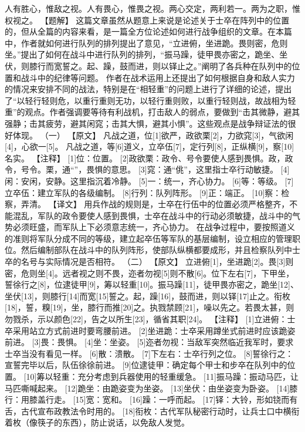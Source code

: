 \documentclass[a4paper,12pt,UTF8,twoside]{ctexbook}
\begin{document}
人有胜心，惟敌之视。人有畏心，惟畏之视。两心交定，两利若一。两为之职，惟权视之。
【题解】
这篇文章虽然从题意上来说是论述关于士卒在阵列中的位置的，但从全篇的内容来看，是一篇全方位论述如何进行战争组织的文章。在本篇中，作者就如何进行队列的排列提出了意见，“立进俯，坐进跪。畏则密，危则坐。”提出了如何在战斗中进行队列的排列，“振马躁，徒甲畏亦密之，跪坐、坐伏，则膝行而宽誓之。起、躁，鼓而进，则以铎止之。”阐明了各兵种在队列中的位置和战斗中的纪律等问题。
作者在战术运用上还提出了如何根据自身和敌人实力的情况来安排不同的战法，特别是在“相轻重”的问题上进行了详细的论述，提出了“以轻行轻则危，以重行重则无功，以轻行重则败，以重行轻则战，故战相为轻重”的观点。作者强调要等待有利战机，打击敌人的弱点，要做到“击其微静，避其强静；击其疲劳，避其闲窕；击其大惧，避其小惧”。这些观点是战争辩证法的很好体现。
（一）
【原文】
凡战之道，位[1]欲严，政欲栗[2]，力欲窕[3]，气欲闲[4]，心欲一[5]。
凡战之道，等[6]道义，立卒伍[7]，定行列[8]，正纵横[9]，察[10]名实。
【注释】
[1]位：位置。
[2]政欲栗：政令、号令要使人感到畏惧。政，政令，号令。栗，通“”，畏惧的意思。
[3]窕：通“佻”，这里指士卒行动敏捷。
[4]闲：安闲，安静。这里指沉着冷静。
[5]一：统一，齐心协力。
[6]等：等级。
[7]立卒伍：建立军队的各级编制。
[8]行列：队列阵形。
[9]正：端正。
[10]察：检察，弄清。
【译文】
用兵作战的规则是，士卒在行伍中的位置必须严格整齐，不能混乱，军队的政令要使人感到畏惧，士卒在战斗中的行动必须敏捷，战斗中的气势必须旺盛，而军队上下必须意志统一，齐心协力。
在战争过程中，要按照道义的准则将军队分成不同的等级，建立起卒伍等军队的基层编制，设立相应的管理职位。然后编制部队在战斗中的队列阵形，使部队纵横都要成形，并且检察队列中士卒的名号与实际情况是否相符。
（二）
【原文】
立进俯[1]，坐进跪[2]。畏[3]则密，危则坐[4]。远者视之则不畏，迩者勿视[5]则不散[6]。位下左右[7]，下甲坐，誓徐行之[8]，位逮徒甲[9]，筹以轻重[10]。振马躁[11]，徒甲畏亦密之，跪坐[12]、坐伏[13]，则膝行[14]而宽[15]誓之。起，躁[16]，鼓而进，则以铎[17]止之。衔枚[18]，誓，糗[19]，坐，膝行而推[20]之。执戮禁顾[21]，噪以先之。若畏太甚，则勿戮杀，示以颜色[22]，告之以所生[23]，循省其职[24]。
【注释】
[1]立进俯：士卒采用站立方式前进时要弯腰前进。
[2]坐进跪：士卒采用蹲坐式前进时应该跪姿前进。
[3]畏：畏惧。
[4]坐：坐姿。
[5]迩者勿视：当敌军突然临近我军时，要求士卒当没有看见一样。
[6]散：溃散。
[7]下左右：士卒行列之位。
[8]誓徐行之：宣誓完毕以后，队伍徐徐前进。
[9]位逮徒甲：确定每个甲士和步卒在队列中的位置。
[10]筹以轻重：充分考虑到兵器使用的轻重缓急。
[11]振马躁：振动马匹，让马匹嘶喊起来。
[12]跪坐：由跪姿变为坐姿。
[13]坐伏：由坐姿变为卧姿。
[14]膝行：用膝盖行走。
[15]宽：宽和。
[16]躁：一呼而起。
[17]铎：大铃，形如铙而有舌，古代宣布政教法令时用的。
[18]衔枚：古代军队秘密行动时，让兵士口中横衔着枚（像筷子的东西），防止说话，以免敌人发觉。
\end{document}

